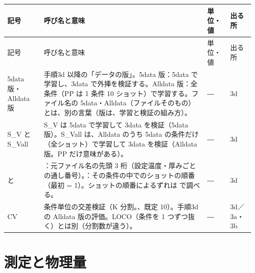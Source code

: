 \documentclass[paper=a4paper,fontsize=10.5pt,line_length=44zw,number_of_lines=38]{jlreq}
\makeatletter
\newcommand{\file}[1]{\texttt{\detokenize{#1}}}
\newenvironment{symtab}{%
  \begin{longtable}{@{}>{\raggedright\arraybackslash}p{6.5\zw}>{\raggedright\arraybackslash}p{22\zw}>{\raggedright\arraybackslash}p{6\zw}>{\raggedright\arraybackslash}p{4.5\zw}@{}}
  \toprule 記号 & 呼び名と意味 & 単位・値 & 出る所 \\ \midrule \endfirsthead
  \toprule 記号 & 呼び名と意味 & 単位・値 & 出る所 \\ \midrule \endhead
  \bottomrule \endlastfoot}{\end{longtable}}
\makeatother
\begin{document}
\begin{symtab}
5data 版・Alldata 版 & 手順3d 以降の「データの版」。5data 版：5data で学習し、3data で外挿を検証する。Alldata 版：全条件（PP は 1 条件 10 ショット）で学習する。ファイル名の 5data・Alldata（ファイルそのもの）とは、別の言葉（版は、学習と検証の組み方）。 & ― & 3d \\
S\_V と S\_Vall & S\_V は 5data で学習して 3data を検証（5data 版）。S\_Vall は、Alldata のうち 5data の条件だけ（全ショット）で学習して 3data を検証（Alldata 版。PP だけ意味がある）。 & ― & 3d \\
\file{shot} と \file{pos} & \file{shot}：元ファイル名の先頭 3 桁（設定温度・厚みごとの通し番号）。\file{pos}：その条件の中でのショットの順番（最初 = 1）。ショットの順番によるずれは \file{pos} で調べる。 & ― & 3d \\
CV & 条件単位の交差検証（K 分割。\file{CV_K}、既定 10）。手順3d の Alldata 版の評価。LOCO（条件を 1 つずつ抜く）とは別（分割数が違う）。 & ― & 3d／3a・3b \\
\end{symtab}

\section{測定と物理量}
\end{document}
